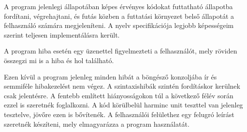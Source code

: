 A program jelenlegi állapotában képes érvényes kódokat futtatható állapotba fordítani, végrehajtani, és futás közben a futtatási környezet belső állapotát a felhasználó számára megjeleníteni. A nyelv specifikációja legjobb képességeim szerint teljesen implementálásra került.

A program hiba esetén egy üzenettel figyelmezteti a felhasználót, mely röviden összegzi mi is a hiba és hol található.

Ezen kívül a program jelenleg minden hibát a böngésző konzoljába ír és semmiféle hibakezelést nem végez. A szintaxishibák szintén fordításkor kerülnek csak jelentésre. A fentebb említett hiányosságokon túl a következő félév során ezzel is szeretnék foglalkozni. A kód körülbelül harminc unit teszttel van jelenleg tesztelve, jövőre ezen is bővítenék. A felhasználói felülethez egy felugró leírást szeretnék készíteni, mely elmagyarázza a program használatát.